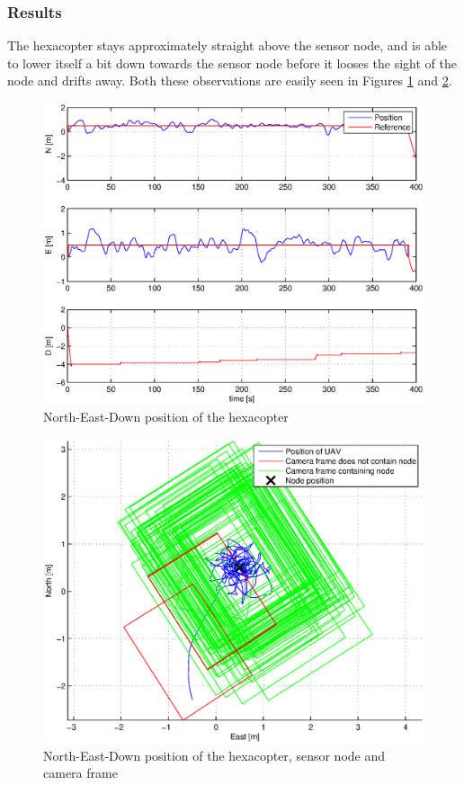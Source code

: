 \subsubsection{Results}
The hexacopter stays approximately straight above the sensor node, and is able to lower itself a bit down towards the sensor node before it looses the sight of the node and drifts away. Both these observations are easily seen in Figures \ref{posVarDisturbance} and \ref{posFrameVarDisturbance}.
\begin{figure}[H]
\centering
\includegraphics[width = 12cm]{fig/plots/simulation/positionVarDisturbance.eps}
\caption{North-East-Down position of the hexacopter}
\label{posVarDisturbance}
\end{figure}
\begin{figure}[H]
\centering
\includegraphics[width = 12cm]{fig/plots/simulation/positionFrameVarDisturbance.eps}
\caption{North-East-Down position of the hexacopter, sensor node and camera frame}
\label{posFrameVarDisturbance}
\end{figure}
